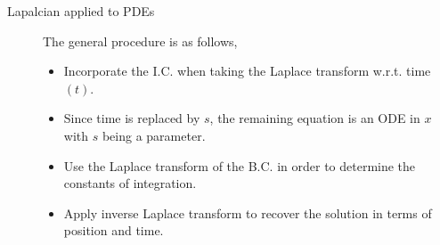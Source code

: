 \begin{description}
    \item[Lapalcian applied to PDEs] The general procedure is as follows,
        \begin{itemize}
            \item Incorporate the I.C. when taking the Laplace transform w.r.t. time
                  $ (t) $.
            \item Since time is replaced by $ s $, the remaining equation is an ODE in
                  $ x $ with $ s $ being a parameter.
            \item Use the Laplace transform of the B.C. in order to determine the
                  constants of integration.
            \item Apply inverse Laplace transform to recover the solution in terms of
                  position and time.
        \end{itemize}
\end{description}